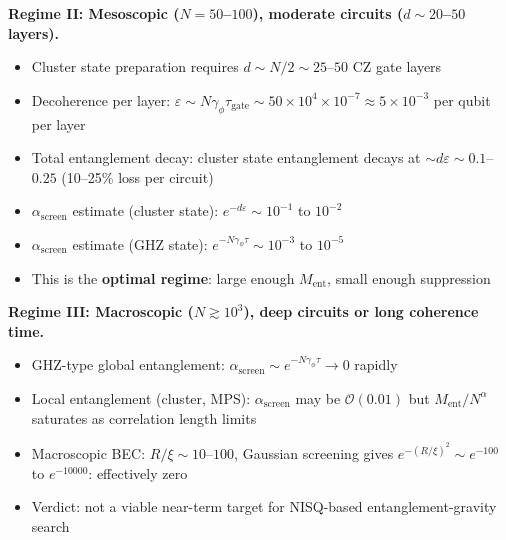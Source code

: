 \documentclass[12pt,letterpaper]{article}
\theoremstyle{plain}
\theoremstyle{definition}
\theoremstyle{remark}
\newcommand{\Ment}{M_{\mathrm{ent}}}
\newcommand{\asc}{\alpha_{\mathrm{screen}}}
\begin{document}
\textbf{Regime II: Mesoscopic ($N = 50$--$100$), moderate circuits ($d \sim 20$--$50$ layers).}
\begin{itemize}
  \item Cluster state preparation requires $d \sim N/2 \sim 25$--$50$ CZ gate layers
  \item Decoherence per layer: $\varepsilon \sim N\gamma_\phi\tau_{\mathrm{gate}} \sim 50\times10^4\times10^{-7} \approx 5\times10^{-3}$ per qubit per layer
  \item Total entanglement decay: cluster state entanglement decays at $\sim d\varepsilon \sim 0.1$--$0.25$ (10--25\% loss per circuit)
  \item $\asc$ estimate (cluster state): $e^{-d\varepsilon} \sim 10^{-1}$ to $10^{-2}$
  \item $\asc$ estimate (GHZ state): $e^{-N\gamma_\phi\tau} \sim 10^{-3}$ to $10^{-5}$
  \item This is the \textbf{optimal regime}: large enough $\Ment$, small enough suppression
\end{itemize}

\textbf{Regime III: Macroscopic ($N \gtrsim 10^3$), deep circuits or long coherence time.}
\begin{itemize}
  \item GHZ-type global entanglement: $\asc \sim e^{-N\gamma_\phi\tau} \to 0$ rapidly
  \item Local entanglement (cluster, MPS): $\asc$ may be $\mathcal{O}(0.01)$ but
    $\Ment/N^{\alpha}$ saturates as correlation length limits
  \item Macroscopic BEC: $R/\xi \sim 10$--$100$, Gaussian screening gives
    $e^{-(R/\xi)^2} \sim e^{-100}$ to $e^{-10000}$: effectively zero
  \item Verdict: not a viable near-term target for NISQ-based entanglement-gravity search
\end{itemize}
\end{document}
